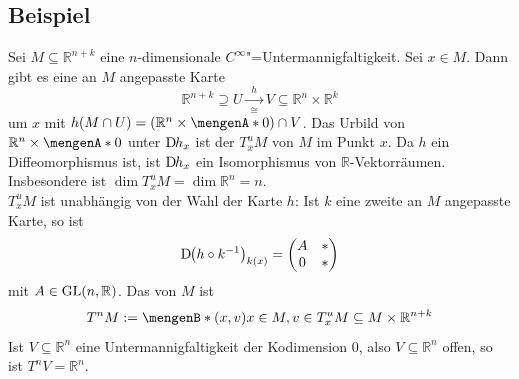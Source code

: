 \subsection[Beispiel: Tangentialraum von Untermannigfaltigkeiten des $\mathds{R}^{n+k}$]{Beispiel} %
\label{sub:183}
Sei $M \subseteq \mathds{R}^{n+k}$ eine $n$-dimensionale $C^\infty$"=Untermannigfaltigkeit. Sei $x \in M$. Dann gibt es eine an $M$ angepasste Karte 
\[
	\mathds{R}^{n+k} \supseteq U \xrightarrow[\cong]{\enspace h \enspace} V \subseteq \mathds{R}^n \times \mathds{R}^k 
\]
um $x$ mit $h(M \cap U) =(\mathds{R}^n \times \set{0})\cap V$.
Das Urbild von $\mathds{R}^n \times \set{0}$ unter $\mathrm{D}\mkern-1.5mu h_x$ ist der  $T^u_x M$ von $M$ im Punkt
$x$. Da $h$ ein Diffeomorphismus ist, ist $\mathrm{D}\mkern-1.5mu h_x$ ein Isomorphismus von $\mathds{R}$-Vektorräumen. Insbesondere ist $\dim T^u_x M = \dim \mathds{R}^n = n$. \smallskip\\
$T_x^u M$ ist unabhängig von der Wahl der Karte $h$: Ist $k$ eine zweite an $M$ angepasste Karte, so ist 
\[
	\D \enbrace*{h \circ k ^{-1}}_{k(x)} = \begin{pmatrix}
		A & * \\
		0 & *
	\end{pmatrix}
\]
mit $A \in \operatorname{GL}(n,\mathbb{R})$. Das  von $M$ ist 
\[
	T^n M := \set[(x,v)]{x \in M, v \in T_x^u M} \subseteq M \times \mathds{R}^{n+k} 
\]
Ist $V \subseteq \mathds{R}^n$ eine Untermannigfaltigkeit der Kodimension $0$, also $V \subseteq \mathds{R}^n$ offen, so ist $T^n V = \mathds{R}^n$.

